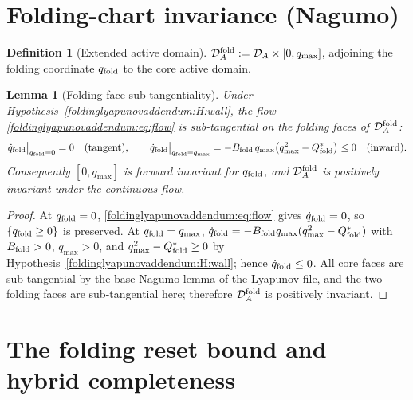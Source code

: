 \documentclass[11pt,a4paper,oneside]{book}
\newcommand{\DA}{\mathcal D_A}
\newcommand{\DAf}{\mathcal D_A^{\rm fold}}
\newcommand{\qf}{q_{\rm fold}}
\newcommand{\Qs}{Q_{\rm fold}^{*}}
\newcommand{\Bf}{B_{\rm fold}}
\theoremstyle{plain}
\newtheorem{lemma}{Lemma}[chapter]
\theoremstyle{definition}
\newtheorem{definition}{Definition}[chapter]
\theoremstyle{remark}
\begin{document}
\section{Folding-chart invariance (Nagumo)}

\begin{definition}[Extended active domain]
$\DAf:=\DA\times[0,q_{\max}]$, adjoining the folding coordinate $\qf$ to the core active domain.
\end{definition}

\begin{lemma}[Folding-face sub-tangentiality]\label{foldinglyapunovaddendum:lem:nagumo}
Under Hypothesis~\ref{foldinglyapunovaddendum:H:wall}, the flow \eqref{foldinglyapunovaddendum:eq:flow} is sub-tangential on the folding faces of
$\DAf$:
\begin{equation}
\dot\qf\big|_{\qf=0}=0\quad(\text{tangent}),
\qquad
\dot\qf\big|_{\qf=q_{\max}}=-\Bf\,q_{\max}\bigl(q_{\max}^{2}-\Qs\bigr)\le0\quad(\text{inward}).
\end{equation}
Consequently $[0,q_{\max}]$ is forward invariant for $\qf$, and $\DAf$ is positively invariant under the
continuous flow.
\end{lemma}
\begin{proof}
At $\qf=0$, \eqref{foldinglyapunovaddendum:eq:flow} gives $\dot\qf=0$, so $\{\qf\ge0\}$ is preserved. At $\qf=q_{\max}$,
$\dot\qf=-\Bf q_{\max}(q_{\max}^{2}-\Qs)$ with $\Bf>0$, $q_{\max}>0$, and $q_{\max}^{2}-\Qs\ge0$ by
Hypothesis~\ref{foldinglyapunovaddendum:H:wall}; hence $\dot\qf\le0$. All core faces are sub-tangential by the base Nagumo lemma
of the Lyapunov file, and the two folding faces are sub-tangential here; therefore $\DAf$ is positively
invariant.
\end{proof}

\section{The folding reset bound and hybrid completeness}
\end{document}
